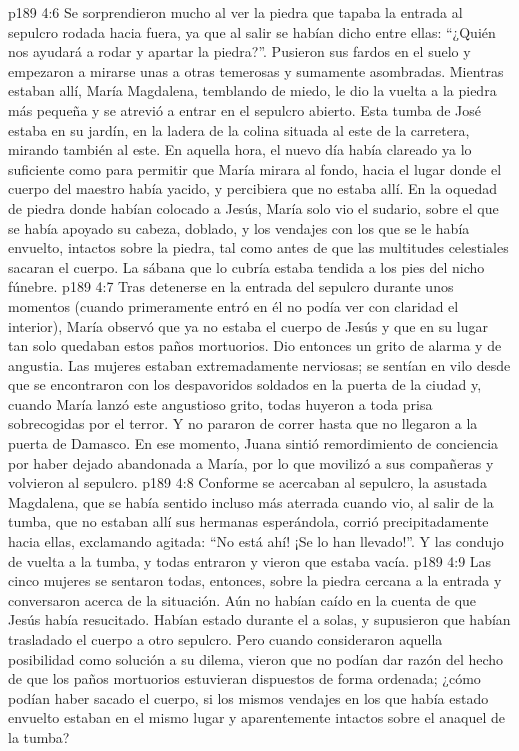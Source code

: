 \vs p189 4:6 Se sorprendieron mucho al ver la piedra que tapaba la entrada al sepulcro rodada hacia fuera, ya que al salir se habían dicho entre ellas: “¿Quién nos ayudará a rodar y apartar la piedra?”. Pusieron sus fardos en el suelo y empezaron a mirarse unas a otras temerosas y sumamente asombradas. Mientras estaban allí, María Magdalena, temblando de miedo, le dio la vuelta a la piedra más pequeña y se atrevió a entrar en el sepulcro abierto. Esta tumba de José estaba en su jardín, en la ladera de la colina situada al este de la carretera, mirando también al este. En aquella hora, el nuevo día había clareado ya lo suficiente como para permitir que María mirara al fondo, hacia el lugar donde el cuerpo del maestro había yacido, y percibiera que no estaba allí. En la oquedad de piedra donde habían colocado a Jesús, María solo vio el sudario, sobre el que se había apoyado su cabeza, doblado, y los vendajes con los que se le había envuelto, intactos sobre la piedra, tal como antes de que las multitudes celestiales sacaran el cuerpo. La sábana que lo cubría estaba tendida a los pies del nicho fúnebre.
\vs p189 4:7 Tras detenerse en la entrada del sepulcro durante unos momentos (cuando primeramente entró en él no podía ver con claridad el interior), María observó que ya no estaba el cuerpo de Jesús y que en su lugar tan solo quedaban estos paños mortuorios. Dio entonces un grito de alarma y de angustia. Las mujeres estaban extremadamente nerviosas; se sentían en vilo desde que se encontraron con los despavoridos soldados en la puerta de la ciudad y, cuando María lanzó este angustioso grito, todas huyeron a toda prisa sobrecogidas por el terror. Y no pararon de correr hasta que no llegaron a la puerta de Damasco. En ese momento, Juana sintió remordimiento de conciencia por haber dejado abandonada a María, por lo que movilizó a sus compañeras y volvieron al sepulcro.
\vs p189 4:8 Conforme se acercaban al sepulcro, la asustada Magdalena, que se había sentido incluso más aterrada cuando vio, al salir de la tumba, que no estaban allí sus hermanas esperándola, corrió precipitadamente hacia ellas, exclamando agitada: “No está ahí! ¡Se lo han llevado!”. Y las condujo de vuelta a la tumba, y todas entraron y vieron que estaba vacía.
\vs p189 4:9 Las cinco mujeres se sentaron todas, entonces, sobre la piedra cercana a la entrada y conversaron acerca de la situación. Aún no habían caído en la cuenta de que Jesús había resucitado. Habían estado durante el  a solas, y supusieron que habían trasladado el cuerpo a otro sepulcro. Pero cuando consideraron aquella posibilidad como solución a su dilema, vieron que no podían dar razón del hecho de que los paños mortuorios estuvieran dispuestos de forma ordenada; ¿cómo podían haber sacado el cuerpo, si los mismos vendajes en los que había estado envuelto estaban en el mismo lugar y aparentemente intactos sobre el anaquel de la tumba?
